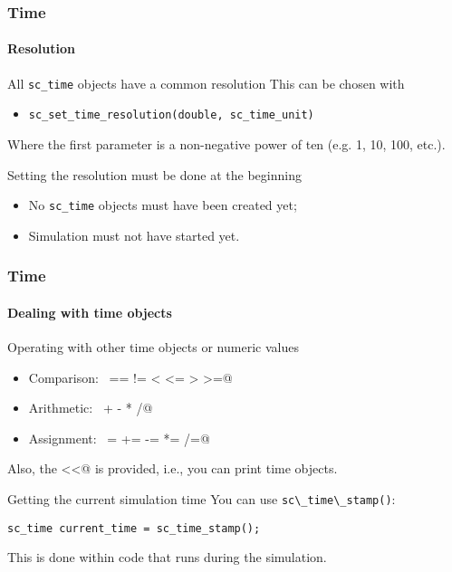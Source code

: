 \begin{frame}
\frametitle{Time}
\framesubtitle{Resolution}

\begin{block}{All \texttt{sc\_time} objects have a common resolution}
This can be chosen with
\begin{itemize}
\item \texttt{sc\_set\_time\_resolution(double, sc\_time\_unit)}
\end{itemize}
Where the first parameter is a non-negative power of ten (e.g. 1, 10, 100, etc.).
\end{block}
\pause
\begin{block}{Setting the resolution must be done at the beginning}
\begin{itemize}
\item No \texttt{sc\_time} objects must have been created yet;
\item Simulation must not have started yet.
\end{itemize}
\end{block}
\end{frame}

\begin{frame}[fragile]
\frametitle{Time}
\framesubtitle{Dealing with time objects}

\begin{block}{Operating with other time objects or numeric values}
\begin{itemize}
\item Comparison: \, \verb@== != < <= > >=@
\item Arithmetic: \, \verb@+ - * /@
\item Assignment: \, \verb@= += -= *= /=@
\end{itemize}
Also, the \verb@operator<<@ is provided, i.e., you can print time objects.
\end{block}
\pause
\begin{block}{Getting the current simulation time}
You can use \verb+sc\_time\_stamp()+: \\
\begin{verbatim}
sc_time current_time = sc_time_stamp();
\end{verbatim}
This is done within code that runs during the simulation.
\end{block}
\end{frame}

